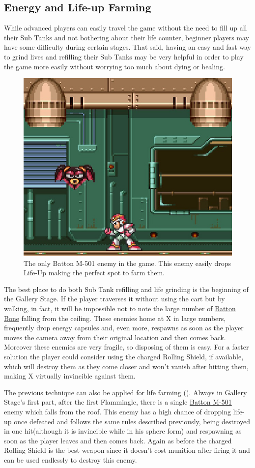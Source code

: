 \subsection{Energy and Life-up Farming}
While advanced players can easily travel the game without the need to fill up all their Sub Tanks and not bothering about their life counter, beginner players may have some difficulty during certain stages. That said, having an easy and fast way to grind lives and refilling their Sub Tanks may be very helpful in order to play the game more easily without worrying too much about dying or healing.
\begin{figure}[htp]
	\centering
	\includegraphics[width=0.5\linewidth]{figures/X1/Miscs/Farming_spot.jpg}
	\caption{The only Batton M-501 enemy in the game. This enemy easily drops Life-Up making the perfect spot to farm them.}
\end{figure}
The best place to do both Sub Tank refilling and life grinding is the beginning of the Gallery Stage. If the player traverses it without using the cart but by walking, in fact, it will be impossible not to note the large number of \hyperlink{enem:Batton_Bone}{Batton Bone}  falling from the ceiling. These enemies home at X in large numbers, frequently drop energy capsules and, even more, respawns as soon as the player moves the camera away from their original location and then comes back. Moreover these enemies are very fragile, so disposing of them is easy. For a faster solution the player could consider using the charged Rolling Shield, if available, which will destroy them as they come closer and won't vanish after hitting them, making X virtually invincible against them.

The previous technique can also be applied for life farming (). Always in Gallery Stage's first part, after the first Flammingle, there is a single \hyperlink{enem:Batton_M-501}{Batton M-501}  enemy which falls from the roof. This enemy has a high chance of dropping life-up once defeated and follows the same rules described previously, being destroyed in one hit(although it is invincible while in his sphere form) and respawning as soon as the player leaves and then comes back. Again as before the charged Rolling Shield is the best weapon since it doesn't cost munition after firing it and can be used endlessly to destroy this enemy.


